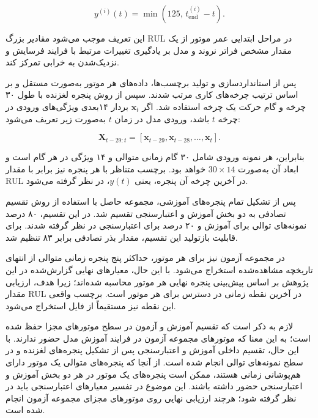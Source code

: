 \begin{equation}
	\label{eq:rul-capped}
	y^{(i)}(t)
	=
	\min
	\left(
	125,\,
	t_{\mathrm{end}}^{(i)}-t
	\right).
\end{equation}

این تعریف موجب می‌شود مقادیر بزرگ \gls{RUL} در مراحل ابتدایی
عمر موتور از یک مقدار مشخص فراتر نروند و مدل بر یادگیری
تغییرات مرتبط با فرایند فرسایش و نزدیک‌شدن به خرابی تمرکز
کند.

پس از استانداردسازی و تولید برچسب‌ها، داده‌های هر موتور
به‌صورت مستقل و بر اساس ترتیب چرخه‌های کاری مرتب شدند.
سپس از روش پنجره لغزنده با طول ۳۰ چرخه و گام حرکت یک چرخه
استفاده شد. اگر $\mathbf{x}_t$ بردار ۱۴بعدی ویژگی‌های ورودی
در چرخه $t$ باشد، ورودی مدل در زمان $t$ به‌صورت زیر تعریف
می‌شود:

\begin{equation}
	\label{eq:lstm-window}
	\mathbf{X}_{t-29:t}
	=
	[
	\mathbf{x}_{t-29},
	\mathbf{x}_{t-28},
	\ldots,
	\mathbf{x}_{t}
	].
\end{equation}

بنابراین، هر نمونه ورودی شامل ۳۰ گام زمانی متوالی و ۱۴
ویژگی در هر گام است و ابعاد آن به‌صورت
$30\times14$ خواهد بود. برچسب متناظر با هر پنجره نیز برابر
با مقدار \gls{RUL} در آخرین چرخه آن پنجره، یعنی $y(t)$،
در نظر گرفته می‌شود.

پس از تشکیل تمام پنجره‌های آموزشی، مجموعه حاصل با استفاده
از روش تقسیم تصادفی به دو بخش آموزش و اعتبارسنجی تقسیم شد.
در این تقسیم، ۸۰ درصد نمونه‌های توالی برای آموزش و ۲۰ درصد
برای اعتبارسنجی در نظر گرفته شدند. برای قابلیت بازتولید
این تقسیم، مقدار بذر تصادفی برابر ۸۳ تنظیم شد.

در مجموعه آزمون نیز برای هر موتور، حداکثر پنج پنجره زمانی
متوالی از انتهای تاریخچه مشاهده‌شده استخراج می‌شود. با این
حال، معیارهای نهایی گزارش‌شده در این پژوهش بر اساس پیش‌بینی
پنجره نهایی هر موتور محاسبه شده‌اند؛ زیرا هدف، ارزیابی
مقدار \gls{RUL} در آخرین نقطه زمانی در دسترس برای هر موتور
است. برچسب واقعی این نقطه نیز مستقیماً از فایل
 استخراج می‌شود.

لازم به ذکر است که تقسیم آموزش و آزمون در سطح موتورهای
مجزا حفظ شده است؛ به این معنا که موتورهای مجموعه آزمون
در فرایند آموزش مدل حضور ندارند. با این حال، تقسیم داخلی
آموزش و اعتبارسنجی پس از تشکیل پنجره‌های لغزنده و در سطح
نمونه‌های توالی انجام شده است. از آنجا که پنجره‌های
متوالی یک موتور دارای هم‌پوشانی زمانی هستند، ممکن است
پنجره‌های یک موتور در هر دو بخش آموزش و اعتبارسنجی حضور
داشته باشند. این موضوع در تفسیر معیارهای اعتبارسنجی
باید در نظر گرفته شود؛ هرچند ارزیابی نهایی روی موتورهای
مجزای مجموعه آزمون انجام شده است.

